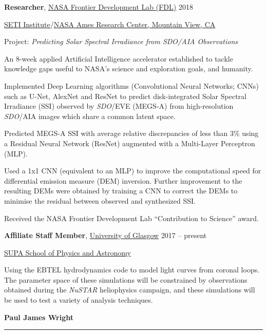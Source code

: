 \documentclass[11pt]{article}
\newcommand{\makeheading}[2][]%
        {\hspace*{-\marginparsep minus \marginparwidth}%
         \begin{minipage}[t]{\textwidth+\marginparwidth+\marginparsep}%
             {\large \bfseries #2 \hfill #1}\\[-0.15\baselineskip]%
                 \rule{\columnwidth}{1pt}%
         \end{minipage}}
\newcommand{\halfblankline}{\quad\vspace{-0.5\baselineskip}\pagebreak[3]}
\begin{document}
\textbf{Researcher},
            \href{http://www.frontierdevelopmentlab.org/}{NASA Frontier Development Lab (FDL)}
            \hfill {2018}
\begin{innerlist}

    \item[] \href{http://seti.org/}{SETI Institute}/\href{}{NASA Ames Research Center, Mountain View, CA}
    \begin{innerlist}
        	\item[] Project: \emph{Predicting Solar Spectral Irradiance from {\it SDO}/AIA Observations}
  	\item{} An 8-week applied Artificial Intelligence accelerator established to tackle knowledge gaps useful to NASA's science and exploration goals, and humanity. 
  	\item{} Implemented Deep Learning algorithms (Convolutional Neural Networks; CNNs) such as U-Net, AlexNet and ResNet to predict disk-integrated Solar Spectral Irradiance (SSI) observed by {\it SDO}/EVE (MEGS-A) from high-resolution {\it SDO}/AIA images which share a common latent space. 
  	\item{} Predicted MEGS-A SSI with average relative discrepancies of less than $3\%$ using a Residual Neural Network (ResNet) augmented with a Multi-Layer Perceptron (MLP).%
  	\item{} Used a 1x1 CNN (equivalent to an MLP) to improve the computational speed for differential emission measure (DEM) inversion. Further improvement to the resulting DEMs were obtained by training a CNN to correct the DEMs to minimise the residual between observed and synthesized SSI.
  	\item{} Received the NASA Frontier Development Lab ``Contribution to Science'' award.
  	 \end{innerlist}

\end{innerlist}

\halfblankline

\textbf{Affiliate Staff Member},
            \href{http://www.gla.ac.uk/}{University of Glasgow}
            \hfill {2017 -- present}
\begin{innerlist}

    \item[] \href{http://astro.gla.ac.uk/}{SUPA School of Physics and Astronomy}
    \begin{innerlist}
  	\item{} Using the EBTEL hydrodynamics code to model light curves from coronal loops. The parameter space of these simulations will be constrained by observations obtained during the {\it NuSTAR} heliophysics campaign, and these simulations will be used to test a variety of analysis techniques.
    \end{innerlist}

\end{innerlist}
%
\newpage
\makeheading{Paul James Wright} 
\end{document}
